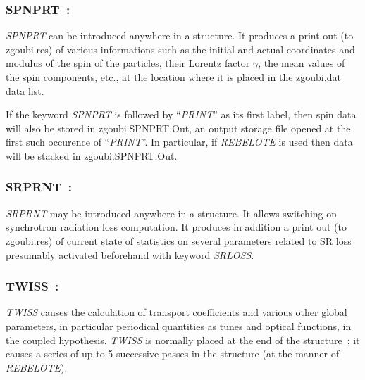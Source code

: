 \newpage

\subsubsection*{SPNPRT~: \SPNPRTTitl}\label{SPNPRT}
\medskip 

\noindent  \textsl{SPNPRT} can be introduced anywhere in a structure. It produces
a print out (to zgoubi.res) of various informations such as 
the initial and actual coordinates and modulus of the spin of the \IMAX{}
particles, their Lorentz factor $\gamma$, 
the mean values of the spin components, etc.,  at the location where it is placed in the zgoubi.dat data list.

\medskip


\noindent  If the keyword \textsl{SPNPRT} is followed by ``\textsl{PRINT}'' as its first label, then spin data will also be stored in 
zgoubi.SPNPRT.Out, an output storage file opened at the first such occurence of ``\textsl{PRINT}''. In particular, if \textsl{REBELOTE} is used then data will be stacked in zgoubi.SPNPRT.Out. 



\newpage

\subsubsection*{SRPRNT~: \SRPRNTTitl}\label{SRPRNT}
\medskip 

\noindent\textsl{SRPRNT} may be introduced anywhere in a structure. It allows switching on 
synchrotron radiation loss computation. It produces in addition 
a print out (to zgoubi.res) of current state of statistics on several parameters related to 
SR loss  presumably  activated beforehand with keyword \textsl{SRLOSS}. 



 \newpage


\subsubsection*{TWISS~: \TWISSTitl}\label{TWISS} 
\medskip

\textsl{TWISS}   causes the calculation of 
  transport coefficients and various other global parameters, in particular 
periodical quantities as tunes and optical functions, in the coupled hypothesis.  
 \textsl{TWISS} is normally placed at the end of the structure~; it  causes a series 
of up to 5 successive passes in the structure (at the manner of \textsl{REBELOTE}). 

